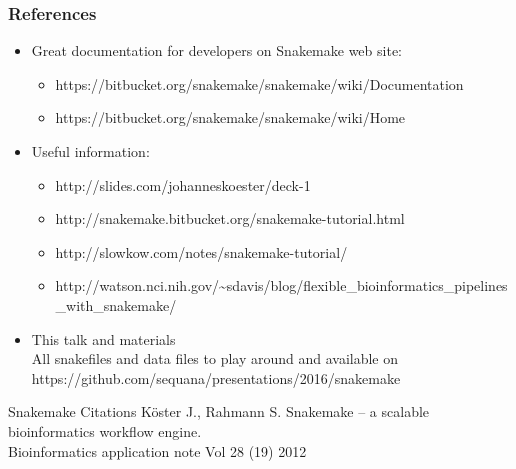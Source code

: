 \documentclass{beamer}
\begin{document}
\begin{frame}
    \frametitle{References}
    \begin{itemize}
        \item Great documentation for developers on Snakemake web site:
        \begin{itemize}
	    \item {\tiny https://bitbucket.org/snakemake/snakemake/wiki/Documentation}
            \item {\tiny https://bitbucket.org/snakemake/snakemake/wiki/Home}
        \end{itemize}        
        \item Useful information:
        \begin{itemize}
            \item {\tiny http://slides.com/johanneskoester/deck-1}
            \item {\tiny http://snakemake.bitbucket.org/snakemake-tutorial.html}
            \item {\tiny http://slowkow.com/notes/snakemake-tutorial/}
            \item {\tiny http://watson.nci.nih.gov/{\textasciitilde{}}sdavis/blog/flexible\_bioinformatics\_pipelines\_with\_snakemake/}
        \end{itemize}
        \item This talk and materials
        \\
        {\normalsize All snakefiles and data files to play 
	  around and available on}
        {\tiny https://github.com/sequana/presentations/2016/snakemake}       
        
    \end{itemize}
    
    \begin{block}{Snakemake Citations}
    {\tiny 
    K\"oster J., Rahmann S. 
    Snakemake -- a scalable bioinformatics workflow engine.    \\
    Bioinformatics application note  Vol 28 (19) 2012 }
    \end{block}
  
        
\end{frame}




\end{document}
